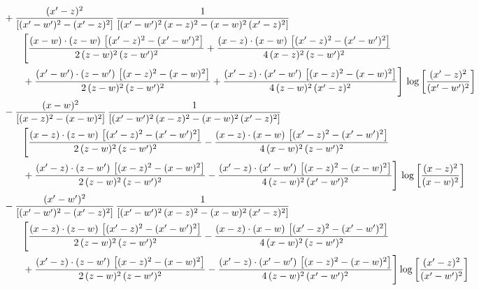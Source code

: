 \documentclass[10pt]{article}
\begin{document}
\begin{align}
&\qquad+\frac{(x^{\prime}-z)^{2}}{\left[(x^{\prime}-w^{\prime})^{2}-(x^{\prime}-z)^{2}\right]}\,\frac{1}{\left[(x^{\prime}-w^{\prime})^{2}\,(x-z)^{2} - (x-w)^{2}\,(x^{\prime}-z)^{2}\right]}\notag\\&\qquad\qquad  \Bigg[\frac{(x-w)\cdot (z-w)\, \left[(x^{\prime}-z)^{2}-(x^{\prime}-w^{\prime})^{2}\right]}{2\, (z-w)^{2}\, (z-w^{\prime})^{2}}  + \frac{(x-z)\cdot (x-w)\,\left[(x^{\prime}-z)^{2}-(x^{\prime}-w^{\prime})^{2}\right] }{4\,(x-z)^{2}\,(z-w^{\prime})^{2}}\notag\\&\qquad\qquad  +\frac{(x^{\prime}-w^{\prime})\cdot (z-w^{\prime})\, \left[(x-z)^{2}-(x-w)^{2}\right]}{2\, (z-w)^{2}\, (z-w^{\prime})^{2}}+ \frac{(x^{\prime}-z)\cdot (x^{\prime}-w^{\prime})\, \left[(x-z)^{2}-(x-w)^{2}\right]}{4\, (z-w)^{2}\,(x^{\prime}-z)^{2}}\Bigg]\, \log{\left[\frac{(x^{\prime}-z)^{2}}{(x^{\prime}-w^{\prime})^{2}}\right]}\notag\\
&\qquad-\frac{(x-w)^{2}}{\left[(x-z)^{2}-(x-w)^{2}\right]}\, \frac{1}{\left[(x^{\prime}-w^{\prime})^{2}\, (x-z)^{2} - (x-w)^{2}\, (x^{\prime}-z)^{2}\right]} \notag\\&\qquad\qquad  \Bigg[\frac{(x-z)\cdot (z-w)\, \left[(x^{\prime}-z)^{2}-(x^{\prime}-w^{\prime})^{2}\right]}{2\, (z-w)^{2}\, (z-w^{\prime})^{2}}  - \frac{(x-z)\cdot (x-w)\,\left[(x^{\prime}-z)^{2}-(x^{\prime}-w^{\prime})^{2}\right] }{4\,(x-w)^{2}\,(z-w^{\prime})^{2}}\notag\\&\qquad\qquad  +\frac{(x^{\prime}-z)\cdot (z-w^{\prime})\, \left[(x-z)^{2}-(x-w)^{2}\right]}{2\, (z-w)^{2}\, (z-w^{\prime})^{2}}-\frac{(x^{\prime}-z)\cdot (x^{\prime}-w^{\prime})\, \left[(x-z)^{2}-(x-w)^{2}\right]}{4\, (z-w)^{2}\,(x^{\prime}-w^{\prime})^{2}}\Bigg]\, \log{\left[\frac{(x-z)^{2}}{(x-w)^{2}}\right]}\notag\\
&\qquad-\frac{(x^{\prime}-w^{\prime})^{2}}{\left[(x^{\prime}-w^{\prime})^{2}-(x^{\prime}-z)^{2}\right]}\, \frac{1}{\left[(x^{\prime}-w^{\prime})^{2}\, (x-z)^{2} - (x-w)^{2}\, (x^{\prime}-z)^{2}\right]}  \notag\\&\qquad\qquad  \Bigg[\frac{(x-z)\cdot (z-w)\, \left[(x^{\prime}-z)^{2}-(x^{\prime}-w^{\prime})^{2}\right]}{2\, (z-w)^{2}\, (z-w^{\prime})^{2}}  - \frac{(x-z)\cdot (x-w)\,\left[(x^{\prime}-z)^{2}-(x^{\prime}-w^{\prime})^{2}\right] }{4\,(x-w)^{2}\,(z-w^{\prime})^{2}}\notag\\&\qquad\qquad  +\frac{(x^{\prime}-z)\cdot (z-w^{\prime})\, \left[(x-z)^{2}-(x-w)^{2}\right]}{2\, (z-w)^{2}\, (z-w^{\prime})^{2}}-\frac{(x^{\prime}-z)\cdot (x^{\prime}-w^{\prime})\, \left[(x-z)^{2}-(x-w)^{2}\right]}{4\, (z-w)^{2}\,(x^{\prime}-w^{\prime})^{2}}\Bigg] \log{\left[\frac{(x^{\prime}-z)^{2}}{(x^{\prime}-w^{\prime})^{2}}\right]}\notag\\

\end{align}
\end{document}
